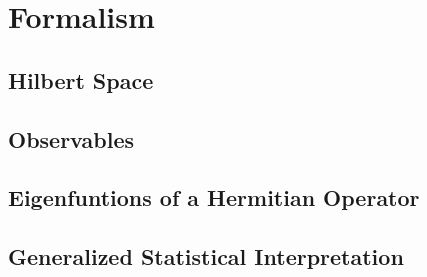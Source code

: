 \section{Formalism}

\subsection{Hilbert Space}

\subsection{Observables}

\subsection{Eigenfuntions of a Hermitian Operator}

\subsection{Generalized Statistical Interpretation}
